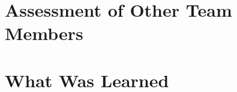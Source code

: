 \documentclass[letterpaper]{article}
\begin{document}
\paragraph*{}


\section*{Assessment of Other Team Members}

\paragraph*{}

\section*{What Was Learned}

\paragraph*{}
\end{document}
